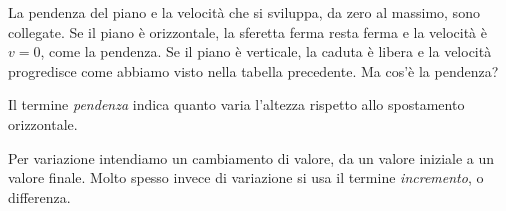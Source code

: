 La pendenza del piano e la velocità che si sviluppa, da zero al massimo, 
sono collegate. 
Se il piano è orizzontale, la sferetta ferma resta ferma e la velocità è 
\(v=0\), come la pendenza. 
Se il piano è verticale, la caduta è libera e la velocità progredisce 
come abbiamo visto nella tabella precedente. 
Ma cos'è la pendenza? 
\begin{definizione}
Il termine \emph{pendenza} indica quanto varia l'altezza rispetto allo 
spostamento orizzontale. 
\end{definizione}

Per variazione intendiamo un cambiamento di valore, da un valore iniziale a 
un valore finale. 
Molto spesso invece di variazione si usa il termine \emph{incremento}, o 
differenza.

